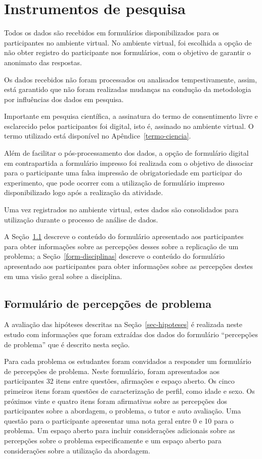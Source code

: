 \section{Instrumentos de pesquisa}
\label{sec-instrumentos-pesquisa}
Todos os dados são recebidos em formulários
disponibilizados para os participantes no ambiente virtual.
No ambiente virtual, foi escolhida a opção de não
obter registro do participante nos formulários, com o objetivo
de garantir o anonimato das respostas.

Os dados recebidos não foram processados ou analisados
tempestivamente, assim, está garantido que não foram
realizadas mudanças na condução da metodologia
por influências dos dados em pesquisa.

Importante em pesquisa científica, a assinatura do termo
de consentimento livre e esclarecido pelos participantes foi digital,
isto é, assinado no ambiente virtual.
O termo utilizado está disponível
no Apêndice~\ref{termo-ciencia}.

Além de facilitar o pós-processamento dos dados, a opção de
formulário digital em contrapartida a formulário impresso foi
realizada com o objetivo de dissociar para o participante
uma falsa impressão de obrigatoriedade em participar do experimento,
que pode ocorrer com a utilização de formulário impresso disponibilizado
logo após a realização da atividade.

Uma vez registrados no ambiente virtual, estes dados são consolidados
para utilização durante o processo de análise de dados.

A Seção~\ref{form-percepcoes} descreve
o conteúdo do formulário apresentado aos participantes para obter
informações sobre as percepções desses sobre a replicação de um problema;
a Seção~\ref{form-disciplinas} descreve
o conteúdo do formulário apresentado aos participantes para obter
informações sobre as percepções destes em uma visão geral sobre a disciplina.

\subsection{Formulário de percepções de problema}
\label{form-percepcoes}
A avaliação das hipóteses descritas na Seção~\ref{sec-hipoteses} é realizada
neste estudo com informações que foram extraídas dos dados do
formulário ``percepções de problema'' que é descrito nesta seção.

Para cada problema os estudantes foram convidados a responder um formulário de percepções de problema.
Neste formulário, foram apresentados aos participantes 32 itens entre questões, afirmações e espaço aberto.
Os cinco primeiros itens foram questões de caracterização de perfil, como
idade e sexo.
Os próximos vinte e quatro itens foram afirmativas sobre as percepções dos participantes sobre a abordagem, o
problema, o tutor e auto avaliação.
Uma questão para o participante apresentar uma nota geral entre 0 e 10 para o problema.
Um espaço aberto para incluir considerações adicionais sobre
as percepções sobre o problema especificamente e um espaço aberto para considerações
sobre a utilização da abordagem.

